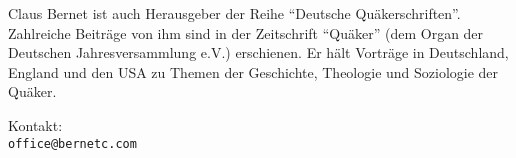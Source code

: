 \medskip

Claus Bernet ist auch Herausgeber der Reihe "`Deutsche Quäkerschriften"'. 
Zahlreiche Beiträge von ihm sind in der Zeitschrift "`Quäker"' (dem Organ der 
Deutschen Jahresversammlung e.V.) erschienen. Er hält Vorträge in Deutschland, 
England und den USA zu Themen der Geschichte, Theologie und Soziologie der 
Quäker. 

\medskip

Kontakt: \\\texttt{office@bernetc.com}


